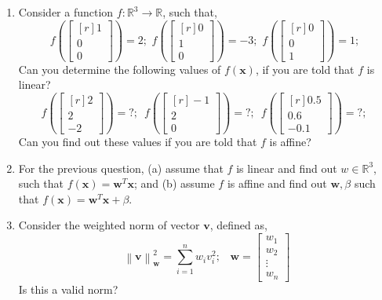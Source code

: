 \documentclass[9pt]{article}
\begin{document}
\begin{multicols}{2}
\begin{enumerate}
      \item Consider a function $f: \mathbb{R}^3 \rightarrow \mathbb{R}$, such that,
      \[ f\left(\begin{bmatrix*}[r]1\\0\\0\end{bmatrix*}\right) = 2; \,\,
      f\left(\begin{bmatrix*}[r]0\\1\\0\end{bmatrix*}\right) = -3; \,\,
      f\left(\begin{bmatrix*}[r]0\\0\\1\end{bmatrix*}\right) = 1; \,\,\]
      Can you determine the following values of $f\left(\mathbf{x}\right)$, if you are told that $f$ is linear?
      \[ f\left(\begin{bmatrix*}[r]2\\2\\-2\end{bmatrix*}\right) = ?; \,\,\,
       f\left(\begin{bmatrix*}[r]-1\\2\\0\end{bmatrix*}\right) = ?; \,\,\,
       f\left(\begin{bmatrix*}[r]0.5\\0.6\\-0.1\end{bmatrix*}\right) = ?; \,\,\,\]
       Can you find out these values if you are told that $f$ is affine?
      
      \item For the previous question, (a) assume that $f$ is linear and find out $w \in \mathbb{R}^3$, such that $f\left(\mathbf{x}\right) = \mathbf{w}^T\mathbf{x}$; and (b) assume $f$ is affine and find out $\mathbf{w}, \beta$ such that $f\left(\mathbf{x}\right) = \mathbf{w}^T\mathbf{x} + \beta$.
  
      \item Consider the weighted norm of vector $\mathbf{v}$, defined as,
      \[ \left\lVert \mathbf{v}\right\rVert_{\mathbf{w}}^2 = \sum_{i=1}^{n}w_iv_i^2; \,\,\,\,\, \mathbf{w}=\begin{bmatrix*}w_1\\w_2\\\vdots\\w_n\end{bmatrix*} \]
      Is this a valid norm?\\
  

\end{enumerate}
\end{multicols}
\end{document}
